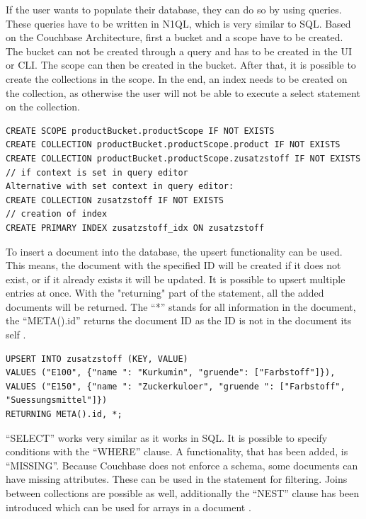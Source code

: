 If the user wants to populate their database, they can do so by using queries. These queries have to be written in \ac{N1QL}, which is very similar to \ac{SQL}. Based on the Couchbase Architecture, first a bucket and a scope have to be created. The bucket can not be created through a query and has to be created in the \ac{UI} or \ac{CLI}. The scope can then be created in the bucket. After that, it is possible to create the collections in the scope. In the end, an index needs to be created on the collection, as otherwise the user will not be able to execute a select statement on the collection.

\begin{lstlisting}
CREATE SCOPE productBucket.productScope IF NOT EXISTS
CREATE COLLECTION productBucket.productScope.product IF NOT EXISTS
CREATE COLLECTION productBucket.productScope.zusatzstoff IF NOT EXISTS
// if context is set in query editor
Alternative with set context in query editor: 
CREATE COLLECTION zusatzstoff IF NOT EXISTS
// creation of index
CREATE PRIMARY INDEX zusatzstoff_idx ON zusatzstoff
\end{lstlisting}

To insert a document into the database, the upsert functionality can be used. This means, the document with the specified ID will be created if it does not exist, or if it already exists it will be updated. It is possible to upsert multiple entries at once. With the "returning" part of the statement, all the added documents will be returned. The ``*'' stands for all information in the document, the ``META().id'' returns the document ID as the ID is not in the document its self \parencite{Couchbase.20230314}.

\begin{lstlisting}
UPSERT INTO zusatzstoff (KEY, VALUE)
VALUES ("E100", {"name ": "Kurkumin", "gruende": ["Farbstoff"]}),
VALUES ("E150", {"name ": "Zuckerkuloer", "gruende ": ["Farbstoff", "Suessungsmittel"]})
RETURNING META().id, *;
\end{lstlisting}

``SELECT'' works very similar as it works in \ac{SQL}. It is possible to specify conditions with the ``WHERE'' clause. A functionality, that has been added, is ``MISSING''. Because Couchbase does not enforce a schema, some documents can have missing attributes. These can be used in the statement for filtering. Joins between collections are possible as well, additionally the ``NEST'' clause has been introduced which can be used for arrays in a document \parencite{Couchbase.20230314b}.

